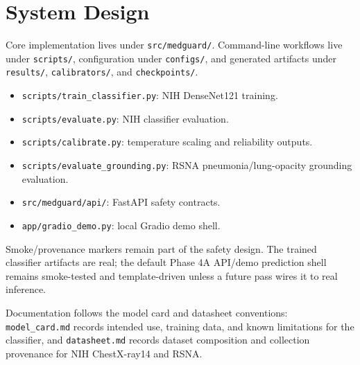 \section{System Design}

Core implementation lives under \texttt{src/medguard/}. Command-line workflows live under \texttt{scripts/}, configuration under \texttt{configs/}, and generated artifacts under \texttt{results/}, \texttt{calibrators/}, and \texttt{checkpoints/}.

\begin{itemize}
  \item \texttt{scripts/train\_classifier.py}: NIH DenseNet121 training.
  \item \texttt{scripts/evaluate.py}: NIH classifier evaluation.
  \item \texttt{scripts/calibrate.py}: temperature scaling and reliability outputs.
  \item \texttt{scripts/evaluate\_grounding.py}: RSNA pneumonia/lung-opacity grounding evaluation.
  \item \texttt{src/medguard/api/}: FastAPI safety contracts.
  \item \texttt{app/gradio\_demo.py}: local Gradio demo shell.
\end{itemize}

Smoke/provenance markers remain part of the safety design. The trained classifier artifacts are real; the default Phase 4A API/demo prediction shell remains smoke-tested and template-driven unless a future pass wires it to real inference.

Documentation follows the model card \citep{mitchell2019modelcards} and datasheet \citep{gebru2018datasheets} conventions: \texttt{model\_card.md} records intended use, training data, and known limitations for the classifier, and \texttt{datasheet.md} records dataset composition and collection provenance for NIH ChestX-ray14 and RSNA.
